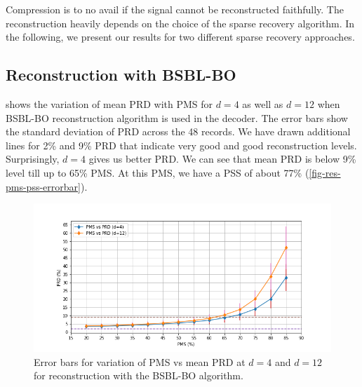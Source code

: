 Compression is to no avail if the signal cannot be reconstructed
faithfully. The reconstruction heavily depends
on the choice of the sparse recovery algorithm.
In the following, we present our results for two different sparse
recovery approaches.

\subsection{Reconstruction with BSBL-BO}

 shows the variation
of mean PRD with PMS for $d=4$ as well as $d=12$ when BSBL-BO
reconstruction algorithm is used in the decoder. The error
bars show the standard deviation of PRD across the 48 records.
We have drawn additional lines for 2\% and 9\% PRD that indicate
very good and good reconstruction levels. 
Surprisingly, $d=4$ gives us better PRD. 
We can see that mean PRD is below 9\% level till up to 65\% PMS.
At this PMS, we have a PSS of about 77\% (\cref{fig-res-pms-pss-errorbar}).

\begin{figure}
\centering
\includegraphics[width=0.95\linewidth]{images/bsbl/pms-vs-prd-errorbar.png}
\caption{Error bars for variation of PMS vs mean PRD at $d=4$ and $d=12$
for reconstruction with the BSBL-BO algorithm.}
\label{fig-res-bsbl-pms-prd-errorbar}
\end{figure}




